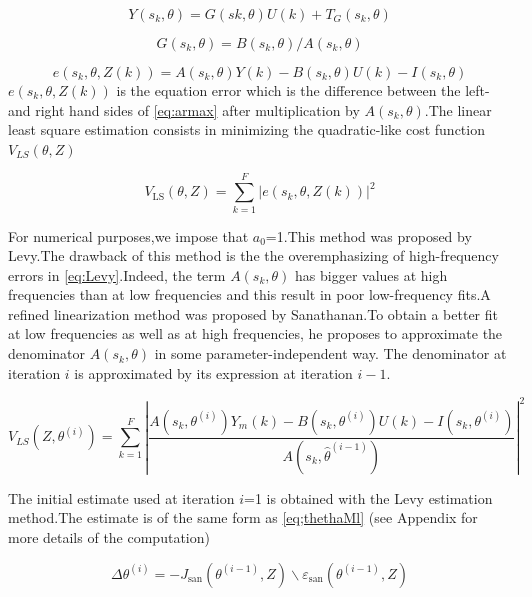 \documentclass[a4paper,12pt]{report}
\numberwithin{equation}{section}
\begin{document}
\begin{equation}\label{eq:armax}
Y\left(s_{k}, \theta\right)=G\left(s{k}, \theta\right) U(k) + T_{G}\left(s_{k}, \theta\right)
\end{equation}

$$
G(s_{k}, \theta)=B(s_{k}, \theta) / A(s_{k}, \theta)
$$

$$
e\left(s_{k}, \theta, Z(k)\right)=A\left(s_{k}, \theta\right) Y(k)-B\left(s_{k}, \theta\right) U(k)- I\left(s_{k}, \theta\right)
$$
\noindent
$e\left(s_{k}, \theta, Z(k)\right)$ is the equation error  which is the difference between the left- and right hand sides of \ref{eq:armax}  after multiplication by $A\left(s_{k}, \theta\right)$.The linear least square estimation consists in minimizing the  quadratic-like cost function $V_{LS}(\theta
, Z)$

\begin{equation}\label{eq:Levy}
V_{\mathrm{LS}}(\theta, Z)=\sum_{k=1}^{F}\left|e\left(s_{k}, \theta, Z(k)\right)\right|^{2}
\end{equation}

\noindent
For numerical purposes,we impose that $a_{0}$=1.This method was proposed by Levy.The drawback of this method is the the overemphasizing of high-frequency errors in \ref{eq:Levy}.Indeed, the term $A\left(s_{k}, \theta\right)$ has bigger values at high frequencies than at low frequencies and this result in poor low-frequency fits.A refined linearization method was proposed by Sanathanan.To obtain a better fit at low frequencies as well as at
high frequencies, he proposes to approximate the denominator $A\left(s_{k}, \theta\right)$ in some parameter-independent way. The denominator at iteration $i$ is approximated by its expression at iteration $i-1$.

\begin{equation}
V_{LS}\left(Z, \theta^{(i)}\right)=\sum_{k=1}^{F}\left|\frac{A\left(s_{k}, \theta^{(i)}\right) Y_{m}(k)-B\left(s_{k}, \theta^{(i)}\right) U(k)-I\left(s_{k}, \theta^{(i)}\right)}{A\left(s_{k}, \hat{\theta}^{(i-1)}\right)}\right|^{2}
\end{equation}

\noindent
The initial estimate used at iteration $i$=1 is obtained with the Levy estimation method.The estimate is of the same form as \ref{eq;thethaMl} (see Appendix for more details of the computation)

\begin{equation}\label{eq:ThethaSanathanan}
\Delta \theta^{(i)}=-J_{\mathrm{san}}\left(\theta^{(i-1)}, Z\right) \backslash \varepsilon_{\mathrm{san}}\left(\theta^{(i-1)}, Z\right)
\end{equation}
\end{document}

